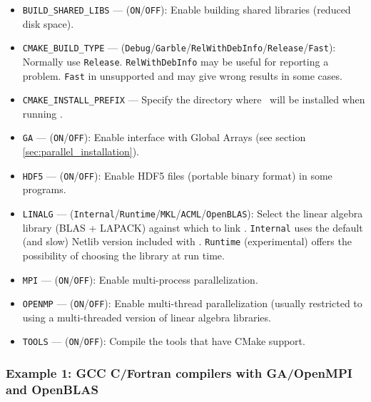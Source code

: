 \begin{itemize}
  \item \verb+BUILD_SHARED_LIBS+ --- (\verb+ON+/\verb+OFF+): Enable building shared libraries (reduced disk space).

  \item \verb+CMAKE_BUILD_TYPE+ --- (\verb+Debug+/\verb+Garble+/\verb+RelWithDebInfo+/\verb+Release+/\verb+Fast+): Normally
  use \verb+Release+. \verb+RelWithDebInfo+ may be useful for reporting a problem. \verb+Fast+ in unsupported
  and may give wrong results in some cases.

  \item \verb+CMAKE_INSTALL_PREFIX+ --- Specify the directory where \molcas\ will be installed when running
  .

  \item \verb+GA+ --- (\verb+ON+/\verb+OFF+): Enable interface with Global Arrays (see section \ref{sec:parallel_installation}).

  \item \verb+HDF5+ --- (\verb+ON+/\verb+OFF+): Enable HDF5 files (portable binary format) in some programs.

  \item \verb+LINALG+ --- (\verb+Internal+/\verb+Runtime+/\verb+MKL+/\verb+ACML+/\verb+OpenBLAS+): Select the linear algebra library (BLAS + LAPACK)
  against which to link \molcas. \verb+Internal+ uses the default (and slow) Netlib version included with \molcas. \verb+Runtime+
  (experimental) offers the possibility of choosing the library at run time.

  \item \verb+MPI+ --- (\verb+ON+/\verb+OFF+): Enable multi-process parallelization.

  \item \verb+OPENMP+ --- (\verb+ON+/\verb+OFF+): Enable multi-thread parallelization (usually restricted to using
  a multi-threaded version of linear algebra libraries.

  \item \verb+TOOLS+ --- (\verb+ON+/\verb+OFF+): Compile the tools that have CMake support.
\end{itemize}


\subsubsection{Example 1: GCC C/Fortran compilers with GA/OpenMPI and OpenBLAS}

